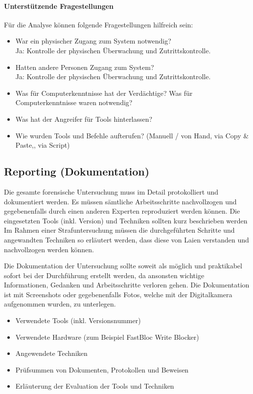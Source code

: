 \paragraph{Unterstützende Fragestellungen}
Für die Analyse können folgende Fragestellungen hilfreich sein:
\begin{itemize}
\item War ein physischer Zugang zum System notwendig?\\
Ja: Kontrolle der physischen Überwachung und Zutrittskontrolle.
\item Hatten andere Personen Zugang zum System?\\
Ja: Kontrolle der physischen Überwachung und Zutrittskontrolle.
\item Was für Computerkenntnisse hat der Verdächtige? Was für Computerkenntnisse waren notwendig?
\item Was hat der Angreifer für Tools hinterlassen?
\item Wie wurden Tools und Befehle aufterufen? (Manuell / von Hand, via Copy \& Paste,, via Script)
\end{itemize}

\subsection{Reporting (Dokumentation)}
Die gesamte forensische Untersuchung muss im Detail protokolliert und dokumentiert werden. Es müssen sämtliche Arbeitsschritte nachvollzogen und gegebenenfalls durch einen anderen Experten reproduziert werden können. Die eingesetzten Tools (inkl. Version) und Techniken sollten kurz beschrieben werden Im Rahmen einer Strafuntersuchung müssen die durchgeführten Schritte und angewandten Techniken so erläutert werden, dass diese von Laien verstanden und nachvollzogen werden können.

Die Dokumentation der Untersuchung sollte soweit als möglich und praktikabel sofort bei der Durchführung erstellt werden, da ansonsten wichtige Informationen, Gedanken und Arbeitsschritte verloren gehen. Die Dokumentation ist mit Screenshots oder gegebenenfalls Fotos, welche mit der Digitalkamera aufgenommen wurden, zu unterlegen.

\begin{itemize}
\item Verwendete Tools (inkl. Versionsnummer)
\item Verwendete Hardware (zum Beispiel FastBloc Write Blocker)
\item Angewendete Techniken
\item Prüfsummen von Dokumenten, Protokollen und Beweisen
\item Erläuterung der Evaluation der Tools und Techniken
\end{itemize}

